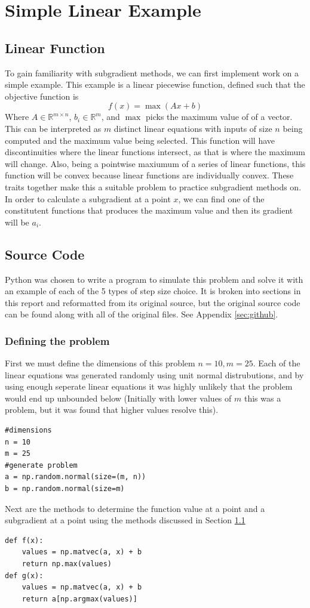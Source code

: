 \documentclass[journal,onecolumn]{IEEEtran}
\begin{document}
\section{Simple Linear Example}\label{sec:linear example}
\subsection{Linear Function}\label{sec:linear math}
To gain familiarity with subgradient methods, we can first implement work on a simple example. This example is a linear piecewise function, defined such that the objective function is
\begin{equation}\label{eq:linear example equation}
f(x) = \max(A x + b)
\end{equation}
Where \(A \in \mathbb{R}^{m \times n}\), \(b_i \in \mathbb{R}^m\), and \(\max\) picks the maximum value of of a vector. This can be interpreted as \(m\) distinct linear equations with inputs of size \(n\) being computed and the maximum value being selected. This function will have discontinuities where the linear functions intersect, as that is where the maximum will change. Also, being a pointwise maxiumum of a series of linear functions, this function will be convex because linear functions are individually convex. These traits together make this a suitable problem to practice subgradient methods on. In order to calculate a subgradient at a point \(x\), we can find one of the constitutent functions that produces the maximum value and then its gradient will be \(a_i\).
\subsection{Source Code}\label{sec:linear code}
Python was chosen to write a program to simulate this problem and solve it with an example of each of the 5 types of step size choice. It is broken into sections in this report and reformatted from its original source, but the original source code can be found along with all of the original files. See Appendix \ref{sec:github}.

\subsubsection{Defining the problem}
First we must define the dimensions of this problem \(n=10, m = 25\). Each of the linear equations was generated randomly using unit normal distrubutions, and by using enough seperate linear equations it was highly unlikely that the problem would end up unbounded below (Initially with lower values of \(m\) this was a problem, but it was found that higher values resolve this).
\begin{verbatim}
#dimensions
n = 10
m = 25
#generate problem
a = np.random.normal(size=(m, n))
b = np.random.normal(size=m)
\end{verbatim}
Next are the methods to determine the function value at a point and a subgradient at a point using the methods discussed in Section \ref{sec:linear math}
\begin{verbatim}
def f(x):
    values = np.matvec(a, x) + b
    return np.max(values)
def g(x):
    values = np.matvec(a, x) + b
    return a[np.argmax(values)]
\end{verbatim}
\end{document}
